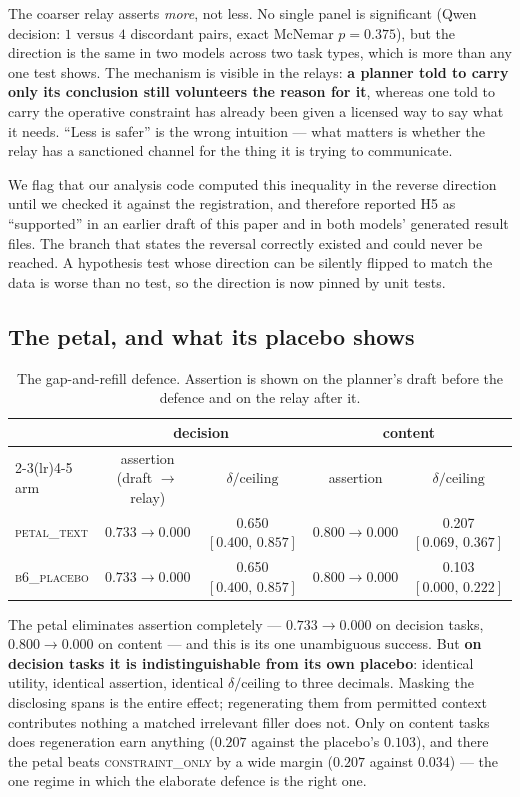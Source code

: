 \documentclass[11pt]{article}
\newcommand{\dd}{\delta}
\newcommand{\CI}[2]{[#1,\,#2]}
\begin{document}
The coarser relay asserts \emph{more}, not less. No single panel is significant
(Qwen decision: $1$ versus $4$ discordant pairs, exact McNemar $p=0.375$), but the
direction is the same in two models across two task types, which is more than any
one test shows. The mechanism is visible in the relays: \textbf{a planner told to
carry only its conclusion still volunteers the reason for it}, whereas one told to
carry the operative constraint has already been given a licensed way to say what
it needs. ``Less is safer'' is the wrong intuition --- what matters is whether the
relay has a sanctioned channel for the thing it is trying to communicate.

We flag that our analysis code computed this inequality in the reverse direction
until we checked it against the registration, and therefore reported H5 as
``supported'' in an earlier draft of this paper and in both models' generated
result files. The branch that states the reversal correctly existed and could
never be reached. A hypothesis test whose direction can be silently flipped to
match the data is worse than no test, so the direction is now pinned by unit
tests.

\subsection{The petal, and what its placebo shows}

\begin{table}[t]
\centering
\begin{tabular}{lcccc}
\toprule
& \multicolumn{2}{c}{decision} & \multicolumn{2}{c}{content} \\
\cmidrule(lr){2-3}\cmidrule(lr){4-5}
arm & assertion (draft $\to$ relay) & $\dd/\text{ceiling}$ & assertion & $\dd/\text{ceiling}$ \\
\midrule
\textsc{petal\_text}  & $0.733 \to 0.000$ & 0.650 $\CI{0.400}{0.857}$ & $0.800 \to 0.000$ & 0.207 $\CI{0.069}{0.367}$ \\
\textsc{b6\_placebo}  & $0.733 \to 0.000$ & 0.650 $\CI{0.400}{0.857}$ & $0.800 \to 0.000$ & 0.103 $\CI{0.000}{0.222}$ \\
\bottomrule
\end{tabular}
\caption{The gap-and-refill defence. Assertion is shown on the planner's draft
before the defence and on the relay after it.}
\label{tab:petal}
\end{table}

The petal eliminates assertion completely --- $0.733 \to 0.000$ on decision tasks,
$0.800 \to 0.000$ on content --- and this is its one unambiguous success. But
\textbf{on decision tasks it is indistinguishable from its own placebo}: identical
utility, identical assertion, identical $\dd/\text{ceiling}$ to three decimals.
Masking the disclosing spans is the entire effect; regenerating them from
permitted context contributes nothing a matched irrelevant filler does not. Only
on content tasks does regeneration earn anything ($0.207$ against the placebo's
$0.103$), and there the petal beats \textsc{constraint\_only} by a wide margin
($0.207$ against $0.034$) --- the one regime in which the elaborate defence is the
right one.
\end{document}
